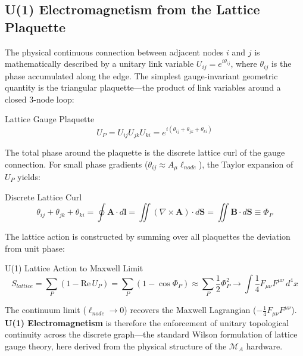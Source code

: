 \subsection{U(1) Electromagnetism from the Lattice Plaquette}
The physical continuous connection between adjacent nodes $i$ and $j$ is mathematically described by a unitary link variable $U_{ij} = e^{i\theta_{ij}}$, where $\theta_{ij}$ is the phase accumulated along the edge. The simplest gauge-invariant geometric quantity is the triangular plaquette---the product of link variables around a closed 3-node loop:
\begin{resultbox}{Lattice Gauge Plaquette}
\begin{equation}
    U_P = U_{ij}U_{jk}U_{ki} = e^{i(\theta_{ij} + \theta_{jk} + \theta_{ki})}
\end{equation}
\end{resultbox}

The total phase around the plaquette is the discrete lattice curl of the gauge connection. For small phase gradients ($\theta_{ij} \approx A_\mu \ell_{node}$), the Taylor expansion of $U_P$ yields:
\begin{resultbox}{Discrete Lattice Curl}
\begin{equation}
    \theta_{ij} + \theta_{jk} + \theta_{ki} = \oint \mathbf{A} \cdot d\mathbf{l} = \iint (\nabla \times \mathbf{A}) \cdot d\mathbf{S} = \iint \mathbf{B} \cdot d\mathbf{S} \equiv \Phi_P
\end{equation}
\end{resultbox}

The lattice action is constructed by summing over all plaquettes the deviation from unit phase:
\begin{resultbox}{U(1) Lattice Action to Maxwell Limit}
\begin{equation}
    S_{lattice} = \sum_P \left(1 - \text{Re}\, U_P\right) = \sum_P \left(1 - \cos\Phi_P\right) \approx \sum_P \frac{1}{2}\Phi_P^2 \longrightarrow \int \frac{1}{4}F_{\mu\nu}F^{\mu\nu}\, d^4x
\end{equation}
\end{resultbox}

The continuum limit ($\ell_{node} \to 0$) recovers the Maxwell Lagrangian ($-\frac{1}{4}F_{\mu\nu}F^{\mu\nu}$). \textbf{U(1) Electromagnetism} is therefore the enforcement of unitary topological continuity across the discrete graph---the standard Wilson formulation of lattice gauge theory, here derived from the physical structure of the $\mathcal{M}_A$ hardware.

